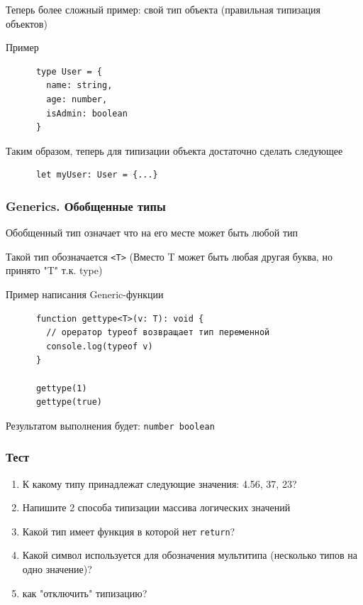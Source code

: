 \documentclass[aspectratio=169]{beamer}
\begin{document}
\begin{frame}[fragile]
  Теперь более сложный пример: свой тип объекта (правильная типизация объектов)
  
  \begin{block}{Пример}
    \begin{verbatim}
      type User = {
        name: string,
        age: number,
        isAdmin: boolean
      }
    \end{verbatim}
    \begin{center}
      Таким образом, теперь для типизации объекта достаточно сделать следующее
    \end{center}
    \begin{verbatim}
      let myUser: User = {...}
    \end{verbatim}
  \end{block}
  
\end{frame}



\begin{frame}[fragile]

  \frametitle{Generics. Обобщенные типы}

  Обобщенный тип означает что на его месте может быть любой тип
  
  Такой тип обозначается \texttt{<T>} (Вместо T может быть любая другая буква, но принято "T" т.к. type) \\

  \begin{block}{Пример написания Generic-функции}
    \begin{verbatim}
      function gettype<T>(v: T): void {
        // орератор typeof возвращает тип переменной
        console.log(typeof v)
      }

      gettype(1)
      gettype(true)

    \end{verbatim}
    Результатом выполнения будет: \texttt{\newline number \newline boolean}
  \end{block}
  
\end{frame}


\begin{frame}

  \frametitle{Тест}

  \begin{enumerate}
  \item К какому типу принадлежат следующие значения: 4.56, 37, 23?
  \item Напишите 2 способа типизации массива логических значений
  \item Какой тип имеет функция в которой нет \texttt{return}? 
  \item Какой символ используется для обозначения мультитипа (несколько типов на одно значение)?
  \item как "отключить" типизацию?
  \end{enumerate}
  
\end{frame}
\end{document}
